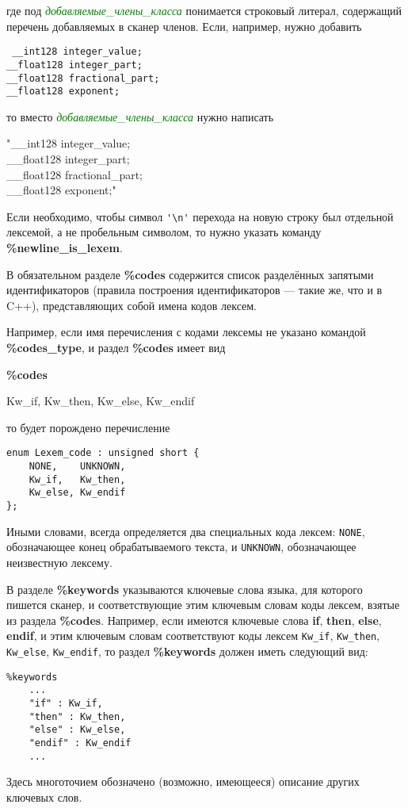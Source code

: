 \documentclass[10pt]{report}
\begin{document}
\noindent %
где под \textcolor{Green}{\textit{добавляемые_члены_класса}} понимается строковый литерал, содержащий перечень добавляемых в сканер членов. Если, например, нужно добавить 

\noindent%
\texttt{%
__int128   integer_value;\\
__float128 integer_part;\\
__float128 fractional_part;\\
__float128 exponent;
}

\noindent то вместо \textcolor{Green}{\textit{добавляемые_члены_класса}} нужно написать

\noindent%
"__int128   integer_value;\\
__float128 integer_part;\\
__float128 fractional_part;\\
__float128 exponent;"

Если необходимо, чтобы символ \verb"'\n'" перехода на новую строку был отдельной лексемой, а не пробельным символом, то нужно указать команду 
\textbf{\%newline_is_lexem}.

В обязательном разделе  \textbf{\%codes} содержится список разделённых запятыми идентификаторов (правила построения идентификаторов --- такие же, что и в C++), представляющих 
собой имена кодов лексем. 

Например, если имя перечисления с кодами лексемы не указано командой \textbf{\%codes_type}, и раздел  \textbf{\%codes} имеет вид

\noindent%
\textbf{\%codes} 

Kw_if, Kw_then, Kw_else, Kw_endif

\noindent то будет порождено перечисление
\begin{verbatim}
enum Lexem_code : unsigned short {
    NONE,    UNKNOWN,
    Kw_if,   Kw_then, 
    Kw_else, Kw_endif
};
\end{verbatim}

Иными словами, всегда определяется два специальных кода лексем: \texttt{NONE}, обозначающее конец обрабатываемого текста, и \texttt{UNKNOWN}, обозначающее неизвестную лексему.

В разделе \textbf{\%keywords} указываются ключевые слова языка, для которого пишется сканер, и соответствующие этим ключевым словам коды лексем, взятые из
раздела \textbf{\%codes}. 
Например, если имеются ключевые слова \textbf{if}, \textbf{then}, \textbf{else}, \textbf{endif}, и этим ключевым словам соответствуют коды лексем
\texttt{Kw_if}, \texttt{Kw_then}, \texttt{Kw_else}, \texttt{Kw_endif}, то раздел \textbf{\%keywords} должен иметь следующий вид:
\begin{verbatim}
%keywords
    ...
    "if" : Kw_if,
    "then" : Kw_then,
    "else" : Kw_else,
    "endif" : Kw_endif
    ...
\end{verbatim}
Здесь многоточием обозначено (возможно, имеющееся) описание других ключевых слов.
\end{document}
